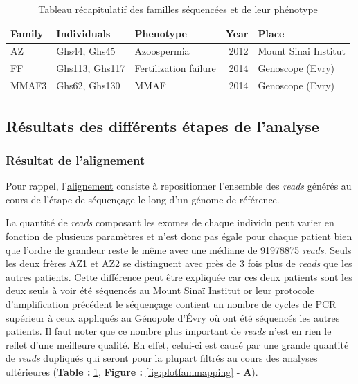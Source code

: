 \documentclass[12pt,twoside]{reedthesis}
\theoremstyle{definition}
\theoremstyle{definition}
\theoremstyle{remark}
\begin{document}
  \begin{longtable}[t]{lllrl}
  \caption{\label{tab:tabfam}Tableau récapitulatif des familles séquencées et de leur phénotype}\\
  \toprule
  Family & Individuals & Phenotype & Year & Place\\
  \midrule
  AZ & Ghs44, Ghs45 & Azoospermia & 2012 & Mount Sinai Institut\\
  FF & Ghs113, Ghs117 & Fertilization failure & 2014 & Genoscope (Evry)\\
  MMAF3 & Ghs62, Ghs130 & MMAF & 2014 & Genoscope (Evry)\\
  \bottomrule
  \end{longtable}
  
  \newpage 
  
  \subsection{Résultats des différents étapes de
  l'analyse}\label{resultats-des-differents-etapes-de-lanalyse}
  
  \subsubsection{Résultat de l'alignement}\label{resultat-de-lalignement}
  
  Pour rappel, l'\href{\%7B\#lalignement\%7D}{alignement} consiste à
  repositionner l'ensemble des \emph{reads} générés au cours de l'étape de
  séquençage le long d'un génome de référence.
  
  La quantité de \emph{reads} composant les exomes de chaque individu peut
  varier en fonction de plusieurs paramètres et n'est donc pas égale pour
  chaque patient bien que l'ordre de grandeur reste le même avec une
  médiane de 91978875 \emph{reads}. Seuls les deux frères AZ1 et AZ2 se
  distinguent avec près de 3 fois plus de \emph{reads} que les autres
  patients. Cette différence peut être expliquée car ces deux patients
  sont les deux seuls à voir été séquencés au Mount Sinaï Institut or leur
  protocole d'amplification précédent le séquençage contient un nombre de
  cycles de PCR supérieur à ceux appliqués au Génopole d'Évry où ont été
  séquencés les autres patients. Il faut noter que ce nombre plus
  important de \emph{reads} n'est en rien le reflet d'une meilleure
  qualité. En effet, celui-ci est causé par une grande quantité de
  \emph{reads} dupliqués qui seront pour la plupart filtrés au cours des
  analyses ultérieures (\textbf{Table :} \ref{tab:tabfam}, \textbf{Figure
  : }\ref{fig:plotfammapping} - \textbf{A}).
  
\end{document}
